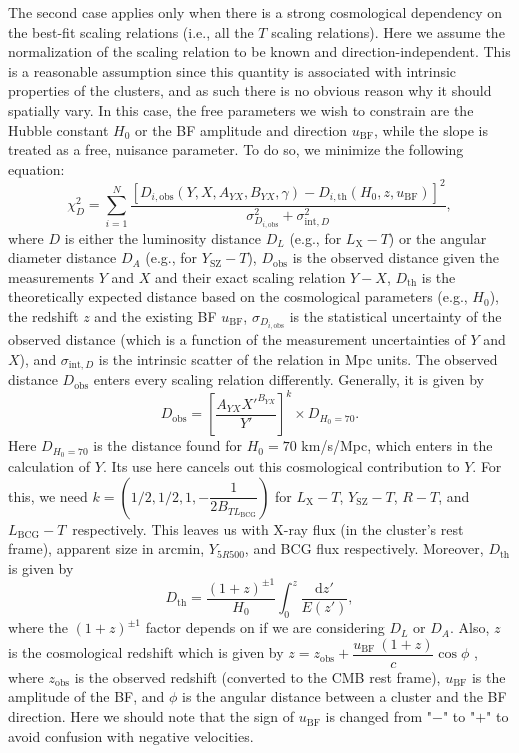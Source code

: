 \documentclass{aa}   %
\newcommand{\LT}{$L_{\text{X}}-T$}
\newcommand{\YT}{$Y_{\text{SZ}}-T$}
\newcommand{\LbcgT}{$L_{\text{BCG}}-T$}
\newcommand{\RT}{$R-T$}
\newcommand{\ubf}{$u_{\text{BF}}$}
\begin{document}
The second case applies only when there is a strong cosmological dependency on the best-fit scaling relations (i.e., all the $T$ scaling relations). Here we assume the normalization of the scaling relation to be known and direction-independent. This is a reasonable assumption since this quantity is associated with intrinsic properties of the clusters, and as such there is no obvious reason why it should spatially vary. In this case, the free parameters we wish to constrain are the Hubble constant $H_0$ or the BF amplitude and direction \ubf, while the slope is treated as a free, nuisance parameter. To do so, we minimize the following equation:
\begin{equation}
\chi^2_{D}=\sum\limits_{i=1}^N\frac{\left[D_{i,\text{obs}}(Y,X,A_{YX},B_{YX},\gamma)-D_{i,\text{th}}(H_0,z,{u_{\text{BF}}})\right]^2}{\sigma_{D_{i,\text{obs}}}^2+{\sigma_{\text{int},D}^2}},
\label{Dist_eq}
\end{equation}
where $D$ is either the luminosity distance $D_L$ (e.g., for \LT) or the angular diameter distance $D_A$ (e.g., for \YT), $D_{\text{obs}}$ is the observed distance given the measurements $Y$ and $X$ and their exact scaling relation $Y-X$, $D_{\text{th}}$ is the theoretically expected distance based on the cosmological parameters (e.g., $H_0$), the redshift $z$ and the existing BF \ubf, $\sigma_{D_{i,\text{obs}}}$ is the statistical uncertainty of the observed distance (which is a function of the measurement uncertainties of $Y$ and $X$), and $\sigma_{\text{int},D}$ is the intrinsic scatter of the relation in Mpc units. The observed distance $D_{\text{obs}}$ enters every scaling relation differently. Generally, it is given by
\begin{equation}
D_{\text{obs}}=\left[\dfrac{A_{YX}{X'}^{B_{YX}}}{Y'}\right]^{k}\times D_{H_0=70}.
\end{equation}
Here $D_{H_0=70}$ is the distance found for $H_0=70$ km/s/Mpc, which enters in the calculation of $Y$. Its use here cancels out this cosmological contribution to $Y$. For this, we need $k=\left(1/2,1/2,1,-\dfrac{1}{2B_{TL_{\text{BCG}}}}\right)$ for \LT, \YT, \RT, and \LbcgT\ respectively. This leaves us with X-ray flux (in the cluster's rest frame), apparent size in arcmin, $Y_{5R500}$, and BCG flux respectively. Moreover, $D_{\text{th}}$ is given by
\begin{equation}
D_{\text{th}}=\dfrac{(1+z)^{\pm 1}}{H_0} \int_0^{z}\frac{\mathrm{d}z'}{E(z')},
\label{dist_eq_new}
\end{equation}
 where the $(1+z)^{\pm 1}$ factor depends on if we are considering $D_L$ or $D_A$. Also, $z$ is the cosmological redshift which is given by $z=z_{\text{obs}}+\dfrac{u_{\text{BF}}\ (1+z)}{c}\cos{\phi}$ \citep[e.g.,][]{harrison,dai,feindt,springbob}, where $z_{\text{obs}}$ is the observed redshift (converted to the CMB rest frame), $u_{\text{BF}}$ is the amplitude of the BF, and $\phi$ is the angular distance between a cluster and the BF direction. Here we should note that the sign of $u_{\text{BF}}$ is changed from "$-$" to "$+$" to avoid confusion with negative velocities.
\end{document}

